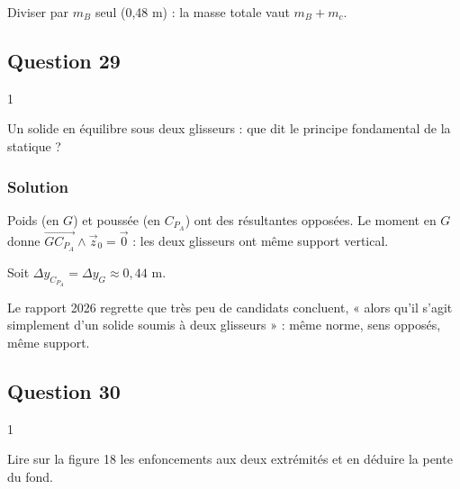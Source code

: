 \documentclass[11pt,a4paper]{article}
\newcommand{\equationajustee}[1]{%
  \sbox{\boiteequation}{$\displaystyle #1$}%
  \ifdim\wd\boiteequation>\linewidth
    \[\resizebox{\linewidth}{!}{\usebox{\boiteequation}}\]%
  \else
    \[#1\]%
  \fi}
\begin{document}
\begin{piege}

Diviser par \(m_B\) seul (0,48 m) : la masse totale vaut \(m_B+m_c\).

\end{piege}

\hypertarget{question-29}{%
\subsection{Question 29}\label{question-29}}

\begin{indication}{1}

Un solide en équilibre sous deux glisseurs : que dit le principe fondamental de la statique ?

\end{indication}

\hypertarget{solution-28}{%
\subsubsection{Solution}\label{solution-28}}

Poids (en \(G\)) et poussée (en \(C_{P_A}\)) ont des résultantes opposées. Le moment en \(G\) donne \(\overrightarrow{GC_{P_A}}\wedge\vec z_0=\vec0\) : les deux glisseurs ont même support vertical.

\equationajustee{\boxed{y_{C_{P_A}}=y_G}}

Soit \(\Delta y_{C_{P_A}}=\Delta y_G\approx0{,}44\) m.

\begin{jury}

Le rapport 2026 regrette que très peu de candidats concluent, « alors qu'il s'agit simplement d'un solide soumis à deux glisseurs » : même norme, sens opposés, même support.

\end{jury}

\hypertarget{question-30}{%
\subsection{Question 30}\label{question-30}}

\begin{indication}{1}

Lire sur la figure 18 les enfoncements aux deux extrémités et en déduire la pente du fond.

\end{indication}
\end{document}
